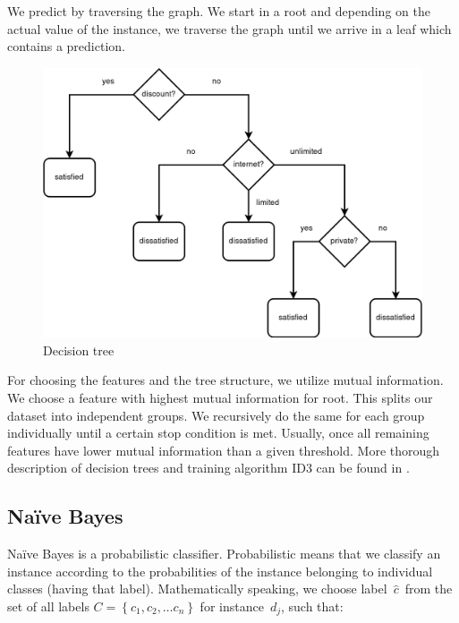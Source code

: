 We predict by traversing the graph.
We start in a root and depending on the actual value of the instance,
we traverse the graph until we arrive in a leaf which contains a prediction.

\begin{figure}[h]
	\centering
	\includegraphics[width=\textwidth]{figures/decisiontree.png}
	\caption{Decision tree} \label{fig:tree}
\end{figure}

For choosing the features and the tree structure,
we utilize mutual information.
We choose a feature with highest mutual information for root.
This splits our dataset into independent groups.
We recursively do the same for each group individually until a certain stop condition is met.
Usually, once all remaining features have lower mutual information than a given threshold.
More thorough description of decision trees and training algorithm ID3 can be found in
\citet{Quinlan1986}.





\subsection{Na\"{i}ve Bayes}

Na\"{i}ve Bayes is a probabilistic classifier.
Probabilistic means that we classify an instance according to the probabilities of the instance belonging to individual classes (having that label).
Mathematically speaking, we choose label~$\hat{c}$~from the set of all labels $C=\left\{c_1,c_2,\dots c_n\right\}$ for instance~$d_j$, such that:

